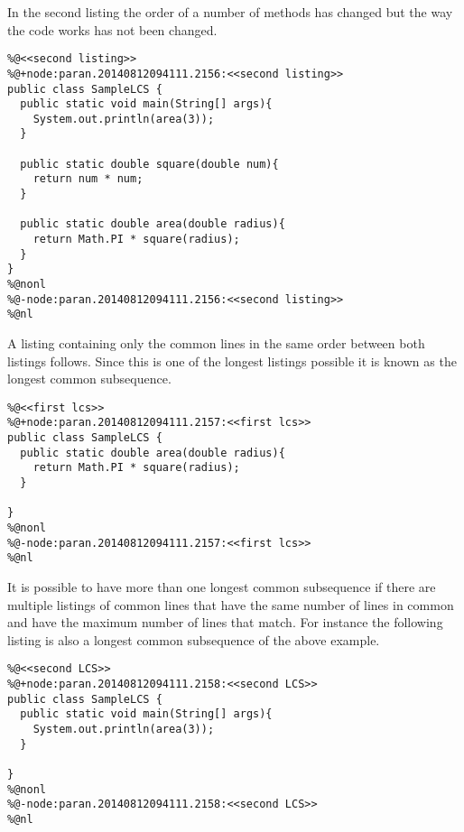\begin{minipage}[t]{1.0\textwidth}
In the second listing the order of a number of methods has changed but the way the code works has not been changed.

\begin{lstlisting}
%@<<second listing>>
%@+node:paran.20140812094111.2156:<<second listing>>
public class SampleLCS {
  public static void main(String[] args){
    System.out.println(area(3));
  }
 
  public static double square(double num){
    return num * num;
  }
 
  public static double area(double radius){
    return Math.PI * square(radius);
  }
}
%@nonl
%@-node:paran.20140812094111.2156:<<second listing>>
%@nl
\end{lstlisting}
\end{minipage}

\begin{minipage}[t]{1.0\textwidth}
A listing containing only the common lines in the same order between both listings follows.  Since this is one of the longest listings possible it is known as the longest common subsequence.  

\begin{lstlisting}
%@<<first lcs>>
%@+node:paran.20140812094111.2157:<<first lcs>>
public class SampleLCS { 
  public static double area(double radius){
    return Math.PI * square(radius);
  }
  
}
%@nonl
%@-node:paran.20140812094111.2157:<<first lcs>>
%@nl
\end{lstlisting}
\end{minipage}

\begin{minipage}[t]{1.0\textwidth}
It is possible to have more than one longest common subsequence if there are multiple listings of common lines that have the same number of lines in common and have the maximum number of lines that match.  For instance the following listing is also a longest common subsequence of the above example.

\begin{lstlisting}
%@<<second LCS>>
%@+node:paran.20140812094111.2158:<<second LCS>>
public class SampleLCS {
  public static void main(String[] args){
    System.out.println(area(3));
  }
 
}
%@nonl
%@-node:paran.20140812094111.2158:<<second LCS>>
%@nl
\end{lstlisting}
\end{minipage}

